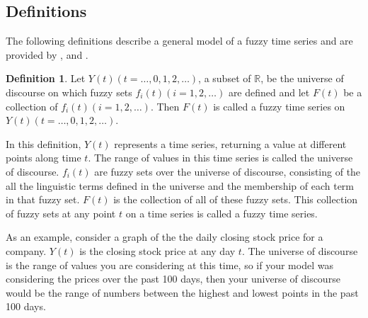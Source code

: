 \documentclass{article}
\theoremstyle{definition}
\newtheorem{ftsdef}{Definition}
\begin{document}

\subsection{Definitions}

The following definitions describe a general model of a fuzzy time series and are provided by \cite{song1993forecasting}, \cite{chen1996forecasting} and \cite{chu2009fuzzy}.

\begin{ftsdef}
Let $Y(t)(t= \ldots,0,1,2, \ldots)$, a subset of $\mathbb{R}$, be the universe of discourse on which fuzzy sets $f_i(t)(i=1,2,\ldots)$ are defined and let $F(t)$ be a collection of $f_i(t)(i=1,2,\ldots)$. Then $F(t)$ is called a fuzzy time series on $Y(t)(t= \ldots,0,1,2, \ldots)$.
\end{ftsdef}
In this definition, $Y(t)$ represents a time series, returning a value at different points along time $t$. The range of values in this time series is called the universe of discourse. $f_i(t)$ are fuzzy sets over the universe of discourse, consisting of the all the linguistic terms defined in the universe and the membership of each term in that fuzzy set. $F(t)$ is the collection of all of these fuzzy sets. This collection of fuzzy sets at any point $t$ on a time series is called a fuzzy time series.

As an example, consider a graph of the the daily closing stock price for a company. $Y(t)$ is the closing stock price at any day $t$. The universe of discourse is the range of values you are considering at this time, so if your model was considering the prices over the past 100 days, then your universe of discourse would be the range of numbers between the highest and lowest points in the past 100 days. 
\end{document}
